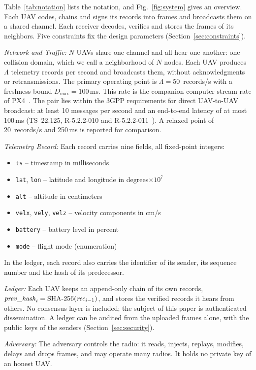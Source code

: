 \documentclass[lineno,pdflatex,sn-mathphys-num]{sn-jnl}
\newcommand{\runin}[1]{\textit{#1:}}
\renewcommand{\_}{\authbcunderscore\allowbreak}
\begin{document}
Table~\ref{tab:notation} lists the notation, and Fig.~\ref{fig:system} gives an overview. Each
UAV codes, chains and signs its records into frames and broadcasts them on a shared channel.
Each receiver decodes, verifies and stores the frames of its neighbors. Five constraints fix the
design parameters (Section~\ref{sec:constraints}).

\runin{Network and Traffic} $N$ UAVs share one channel and all hear one another: one collision
domain, which we call a neighborhood of $N$ nodes. Each UAV produces $\Lambda$ telemetry records
per second and broadcasts them, without acknowledgments or retransmissions. The primary
operating point is $\Lambda = 50$~records/s with a freshness bound $D_{\max} = 100$\,ms. This rate
is the companion-computer stream rate of PX4~\cite{px4_mavlink_streams}.
The pair lies within the 3GPP requirements for direct UAV-to-UAV broadcast: at least
10 messages per second and an end-to-end latency of at most 100\,ms (TS~22.125, R-5.2.2-010 and
R-5.2.2-011~\cite{3gpp_ts22125}).
A relaxed point of 20~records/s and 250\,ms is reported for comparison.

\runin{Telemetry Record} Each record carries nine fields, all fixed-point integers:
\begin{itemize}
\item \texttt{ts} -- timestamp in milliseconds
\item \texttt{lat}, \texttt{lon} -- latitude and longitude in degrees$\times 10^{7}$
\item \texttt{alt} -- altitude in centimeters
\item \texttt{vel\_x}, \texttt{vel\_y}, \texttt{vel\_z} -- velocity components in cm/s
\item \texttt{battery} -- battery level in percent
\item \texttt{mode} -- flight mode (enumeration)
\end{itemize}
In the ledger, each record also carries the identifier of its sender, its sequence number and
the hash of its predecessor.

\runin{Ledger} Each UAV keeps an append-only chain of its own records,
$\mathit{prev\_hash}_{i} = \mathrm{SHA\mbox{-}256}(\mathit{rec}_{i-1})$, and stores the verified
records it hears from others. No consensus layer is included; the subject of this paper is
authenticated dissemination. A ledger can be audited from the uploaded frames alone, with the
public keys of the senders (Section~\ref{sec:security}).

\runin{Adversary} The adversary controls the radio: it reads, injects, replays, modifies, delays
and drops frames, and may operate many radios. It holds no private key of an honest UAV.
\end{document}
